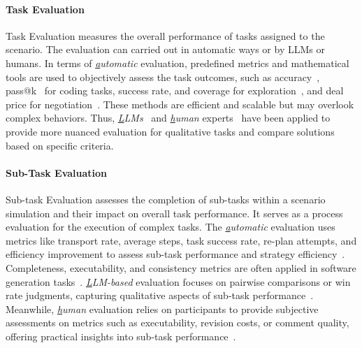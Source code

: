 \paragraph{Task Evaluation}
Task Evaluation measures the overall performance of tasks assigned to the scenario. The evaluation can carried out in automatic ways or by LLMs or humans. In terms of \textit{{\ul automatic}} evaluation, predefined metrics and mathematical tools are used to objectively assess the task outcomes, such as accuracy~\cite{hamilton2023blind,xiong2023examining}, pass@k~\cite{li2023camel} for coding tasks, success rate, and coverage for exploration~\cite{zhu2023ghost}, and deal price for negotiation~\cite{fu2023improving}. These methods are efficient and scalable but may overlook complex behaviors. Thus, \textit{{\ul LLMs}}~\cite{hao2023chatllm} and \textit{{\ul human }}experts~\cite{li2023camel,liang2023encouraging} have been applied to provide more nuanced evaluation for qualitative tasks and compare solutions based on specific criteria.

\paragraph{Sub-Task Evaluation}
Sub-task Evaluation assesses the completion of sub-tasks within a scenario simulation and their impact on overall task performance. It serves as a process evaluation for the execution of complex tasks. The \textit{{\ul automatic}} evaluation uses metrics like transport rate, average steps, task success rate, re-plan attempts, and efficiency improvement to assess sub-task performance and strategy efficiency~\cite{zhang2023building,mandi2024roco}. Completeness, executability, and consistency metrics are often applied in software generation tasks~\cite{qian2024chatdev,qian2023experiential}. \textit{{\ul LLM-based}} evaluation focuses on pairwise comparisons or win rate judgments, capturing qualitative aspects of sub-task performance~\cite{qian2024chatdev}. Meanwhile, \textit{{\ul human}} evaluation relies on participants to provide subjective assessments on metrics such as executability, revision costs, or comment quality, offering practical insights into sub-task performance~\cite{hong2023metagpt,d2024marg}.



